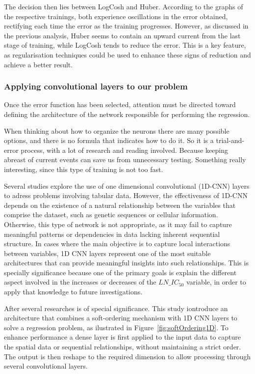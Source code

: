 The decision then lies between LogCosh and Huber. According to the graphs of the respective trainings, both experience oscillations in the error obtained, rectifying each time the error as the training progresses. However, as discussed in the previous analysis, Huber seems to contain an upward current from the last stage of training, while LogCosh tends to reduce the error. This is a key feature, as regularisation techniques could be used to enhance these signs of reduction and achieve a better result.

\subsubsection{Applying convolutional layers to our problem}

Once the error function has been selected, attention must be directed toward defining the architecture of the network responsible for performing the regression.

When thinking about how to organize the neurons there are many possible options, and there is no formula that indicates how to do it. So it is a trial-and-error process, with a lot of research and reading involved. Because keeping abreast of current events can save us from unnecessary testing. Something really interesting, since this type of training is not too fast.

Several studies \cite{arik2020tabnetattentiveinterpretabletabular} \cite{convolutionalToSkipImpute} \cite{tabularIntoImages} explore the use of one dimensional convolutional (1D-CNN) layers to adress problems involving tabular data. However, the effectiveness of 1D-CNN depends on the existence of a natural relationship between the variables that comprise the dataset, such as genetic sequences or cellular information. Otherwise, this type of network is not appropriate, as it may fail to capture meaningful patterns or dependencies in data lacking inherent sequential structure. In cases where the main objective is to capture local interactions between variables, 1D CNN layers represent one of the most suitable architectures that can provide meaningful insights into such relationships. This is specially significance because one of the primary goals is explain the different aspect involved in the increases or decreases of the \(LN\_IC_{50}\) variable, in order to apply that knowledge to future investigations.

After several researches \cite{softOrdering1D} is of special significance. This study iontroduce an architecture that combines a soft-ordering mechanism with 1D CNN layers to solve a regression problem, as ilustrated in Figure~\ref{fig:softOrdering1D}. To enhance performance a dense layer is first applied to the  input data to capture the spatial data or sequential relationships, without maintaining a strict order. The output is then reshape to the required dimension to allow processing through several convolutional layers. 

